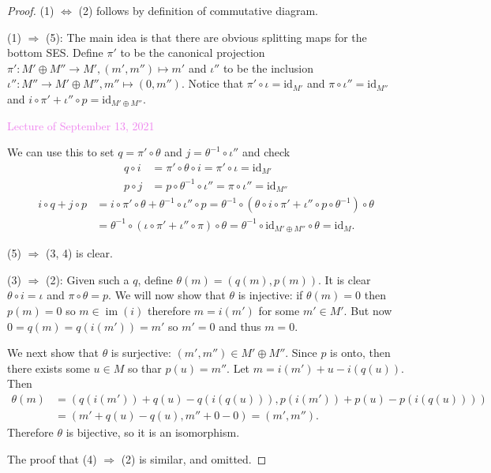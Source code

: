 \documentclass{amsart}[12pt]
\def\image{\operatorname{im}}
\def\im{\image}
\newcommand{\id}{\mathrm{id}}
\newcommand{\Sept}[1]{\textcolor{violet}{Lecture of September #1, 2021}}
\numberwithin{equation}{section}
\theoremstyle{plain} %
\theoremstyle{definition}
\theoremstyle{remark}
\begin{document}
\begin{proof}

(1) $\Leftrightarrow$ (2) follows by definition of commutative diagram.


(1) $\Rightarrow$ (5): The main idea is that there are obvious splitting maps for the bottom SES. Define $\pi'$ to be the canonical projection $\pi':M'\oplus M''\to M', (m',m'')\mapsto m'$ and $\iota''$ to be the inclusion $\iota'':M''\to M'\oplus M'', m''\mapsto (0,m'')$. Notice that $\pi'\circ \iota =\id_{M'}$ and $\pi\circ \iota''=\id_{M''}$ and $i\circ \pi'+ \iota''\circ p=\id_{M'\oplus M''}$.

\Sept{13}


We can use this to set $q=\pi'\circ\theta$ and $j= \theta^{-1}\circ \iota''$ and check
\begin{eqnarray*}
q\circ i &=\pi'\circ\theta \circ i =\pi'\circ \iota =\id_{M'}\\
p\circ j& =p\circ \theta^{-1}\circ \iota'' =\pi\circ \iota''=\id_{M''}
\end{eqnarray*}
\begin{eqnarray*}
i\circ q+j\circ p &=i\circ \pi'\circ\theta+ \theta^{-1}\circ \iota''\circ p=\theta^{-1}\circ ( \theta\circ i\circ \pi'+\iota''\circ p \circ \theta^{-1})\circ \theta\\
&=\theta^{-1}\circ (\iota\circ \pi'+\iota''\circ\pi)\circ \theta =\theta^{-1}\circ \id_{M'\oplus M''} \circ \theta=\id_M.
\end{eqnarray*}

(5) $\Rightarrow$ (3, 4) is clear. 

(3) $\Rightarrow$ (2): Given such a $q$, define  $\theta(m) = (q(m), p(m))$. It is clear $\theta \circ i = \iota$ and $\pi \circ \theta = p$. 
We will now show that $\theta$ is injective: if $\theta(m)=0$ then $p(m)=0$ so $m\in \im(i)$ therefore $m=i(m')$ for some $m'\in M'$. But now $0=q(m)=q(i(m'))=m'$ so $m'=0$ and thus $m=0$. 

We next show that $\theta$ is surjective: $(m',m'')\in M'\oplus M''$. Since $p$ is onto, then there exists some $u\in M$ so thar $p(u)=m''$. Let $m=i(m')+u-i(q(u))$. Then 
\[
\begin{split}
\theta(m) &=(q(i(m'))+q(u)-q(i(q(u))), p(i(m'))+p(u)-p(i(q(u))))\\
&= (m'+q(u)-q(u),m''+0-0)=(m',m'').
\end{split}
\]
Therefore $\theta$ is bijective, so it is an isomorphism. 

The proof that (4) $\Rightarrow$ (2) is similar, and omitted.
\end{proof}
\end{document}
